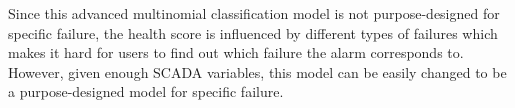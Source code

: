 Since this advanced multinomial classification model is not purpose-designed for specific failure, the health score is influenced by different types of failures which makes it hard for users to find out which failure the alarm corresponds to. However, given enough SCADA variables, this model can be easily changed to be a purpose-designed model for specific failure. 